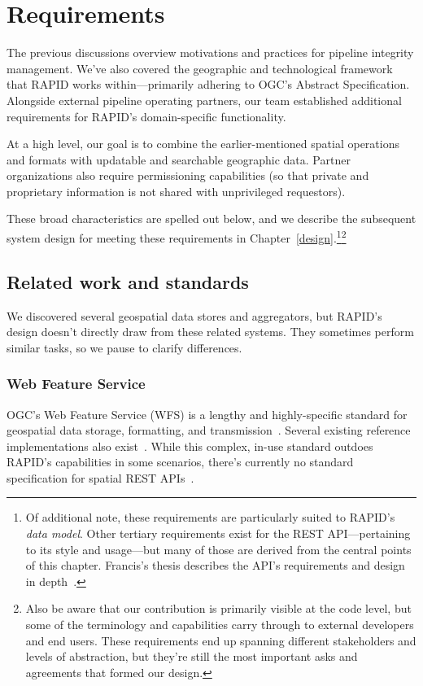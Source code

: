 \chapter{Requirements}
\label{requirements}

The previous discussions overview motivations and practices for pipeline integrity management. We've also covered the geographic and technological framework that RAPID works within---primarily adhering to OGC's Abstract Specification. Alongside external pipeline operating partners, our team established additional requirements for RAPID's domain-specific functionality.

At a high level, our goal is to combine the earlier-mentioned spatial operations and formats with updatable and searchable  geographic data. Partner organizations also require permissioning capabilities (so that private and proprietary information is not shared with unprivileged requestors).

These broad characteristics are spelled out below, and we describe the subsequent system design for meeting these requirements in Chapter~\ref{design}.\footnote{Of additional note, these requirements are particularly suited to RAPID's \textit{data model}. Other tertiary requirements exist for the REST API---pertaining to its style and usage---but many of those are derived from the central points of this chapter. Francis's thesis describes the API's requirements and design in depth~\cite{Francis}.}\footnote{Also be aware that our contribution is primarily visible at the code level, but some of the terminology and capabilities carry through to external developers and end users. These requirements end up spanning different stakeholders and levels of abstraction, but they're still the most important asks and agreements that formed our design.}

\section{Related work and standards}
We discovered several geospatial data stores and aggregators, but RAPID's design doesn't directly draw from these related systems. They sometimes perform similar tasks, so we pause to clarify differences.

\subsection{Web Feature Service}
OGC's Web Feature Service (WFS) is a lengthy and highly-specific standard for geospatial data storage, formatting, and transmission~\cite{WFS}. Several existing reference implementations also exist~\cite{RefImpl}. While this complex, in-use standard outdoes RAPID's capabilities in some scenarios, there's currently no standard specification for spatial REST APIs~\cite{WFS}.

